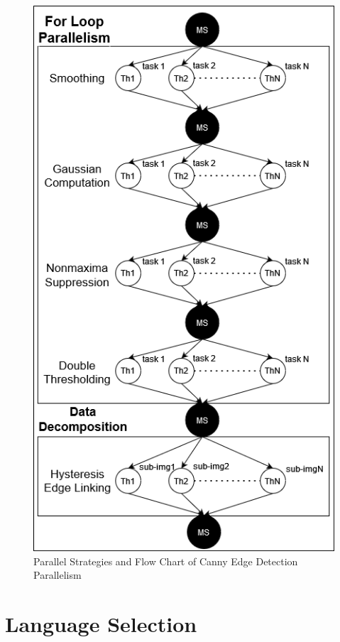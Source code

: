 \documentclass[sigconf,nonacm]{acmart}
\begin{document}
\begin{figure}[h]
  \centering
  \includegraphics[width=\linewidth]{parallel_diagram.png}
  \caption{Parallel Strategies and Flow Chart of Canny Edge Detection Parallelism}
  \label{fig:diagram}
\end{figure}

\section{Language Selection}
\end{document}
